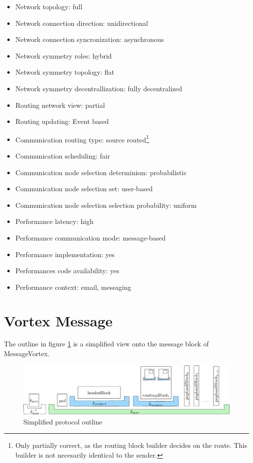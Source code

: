\begin{itemize}
	\item Network topology: full
	\item Network connection direction: unidirectional
	\item Network connection syncronization: asynchronous
	\item Network symmetry roles: hybrid
	\item Network symmetry topology: flat
	\item Network symmetry decentrallization: fully decentralized
	\item Routing network view: partial
	\item Routing updating: Event based
	\item Communication routing type: source routed\footnote{Only partially correct, as the routing block builder decides on the route. This builder is not necesarily identical to the sender.}
	\item Communication scheduling: fair
	\item Communication node selection determinism: probabilistic
	\item Communication node selection set: user-based
	\item Communication node selection selection probability: uniform
	\item Performance latency: high
	\item Performance communication mode: message-based
	\item Performance implementation: yes
	\item Performances code availability: yes
	\item Performance context: email, messaging
\end{itemize}

\section{Vortex Message}
The outline in figure \ref{fig:protocolOutline} is a simplified view onto the message block of MessageVortex.

\begin{figure}[ht]
	\includegraphics[width=\textwidth]{inc/blockLayoutSimplified}
	\caption{Simplified protocol outline}
    \label{fig:protocolOutline}
\end{figure}


